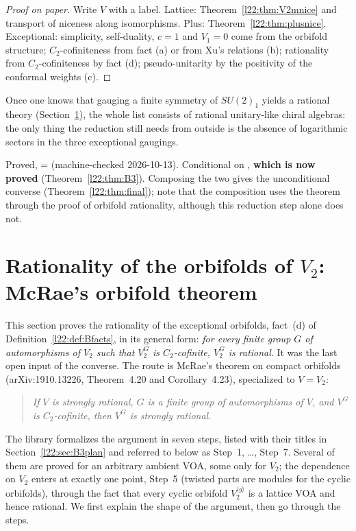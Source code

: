 \begin{proof}[Proof on paper]
Write $V$ with a label. Lattice: Theorem~\ref{l22:thm:V2mnice} and transport of niceness along isomorphisms. Plus:
Theorem~\ref{l22:thm:plusnice}. Exceptional: simplicity, self-duality, $c=1$ and $V_1=0$ come from the orbifold
structure; $C_2$-cofiniteness from fact (a) or from Xu's relations (b); rationality from $C_2$-cofiniteness by fact (d);
pseudo-unitarity by the positivity of the conformal weights (c).
\end{proof}

\begin{physics}
Once one knows that gauging a finite symmetry of $SU(2)_1$ yields a rational theory (Section~\ref{l22:sec:B3}), the
whole list consists of rational unitary-like chiral algebras: the only thing the reduction still needs from outside is
the absence of logarithmic sectors in the three exceptional gaugings.
\end{physics}

\begin{status}
Proved,  =  (machine-checked 2026-10-13).
Conditional on , \textbf{which is now proved} (Theorem~\ref{l22:thm:B3}).
Composing the two gives the unconditional converse 
(Theorem~\ref{l22:thm:final}); note that the composition uses the theorem  through the proof of orbifold
rationality, although this reduction step alone does not.
\end{status}

\section{Rationality of the orbifolds of \texorpdfstring{$V_2$}{V2}: McRae's orbifold theorem}\label{l22:sec:B3}

This section proves the rationality of the exceptional orbifolds, fact~(d) of Definition~\ref{l22:def:Bfacts}, in
its general form: \emph{for every finite group $G$ of automorphisms of $V_2$
such that $V_2^G$ is $C_2$-cofinite, $V_2^G$ is rational}. It was the last open input of the converse. The route is
McRae's theorem on compact orbifolds (arXiv:1910.13226, Theorem~4.20 and Corollary~4.23), specialized to $V=V_2$:
\begin{quote}
\emph{If $V$ is strongly rational, $G$ is a finite group of automorphisms of $V$, and $V^G$ is $C_2$-cofinite, then
$V^G$ is strongly rational.}
\end{quote}
The library formalizes the argument in seven steps, listed with their titles in Section~\ref{l22:sec:B3plan} and
referred to below as Step~1, \ldots, Step~7. Several of them are proved for an arbitrary ambient VOA,
some only for $V_2$; the dependence on $V_2$ enters at exactly one point, Step~5 (twisted parts are modules for the
cyclic orbifolds), through the fact that every cyclic
orbifold $V_2^{\langle g\rangle}$ is a lattice VOA and hence rational. We first explain the shape of the argument, then
go through the steps.

